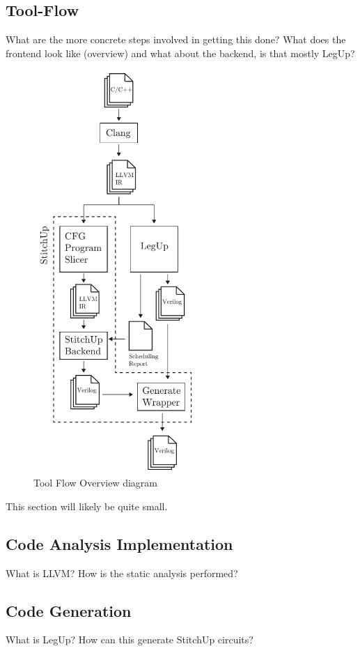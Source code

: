 
\subsection{Tool-Flow}
What are the more concrete steps involved in getting this done?
What does the frontend look like (overview) and what about the backend,
is that mostly LegUp?

\begin{figure}[!t]
\centering
\includegraphics[width=2.5in]{./imgs/tool-flow.pdf}
\caption{Tool Flow Overview diagram}
\label{fig:tool_flow_diagram}
\end{figure}

This section will likely be quite small.

\subsection{Code Analysis Implementation}
What is LLVM? How is the static analysis performed?

\subsection{Code Generation}
What is LegUp? How can this generate StitchUp circuits?
